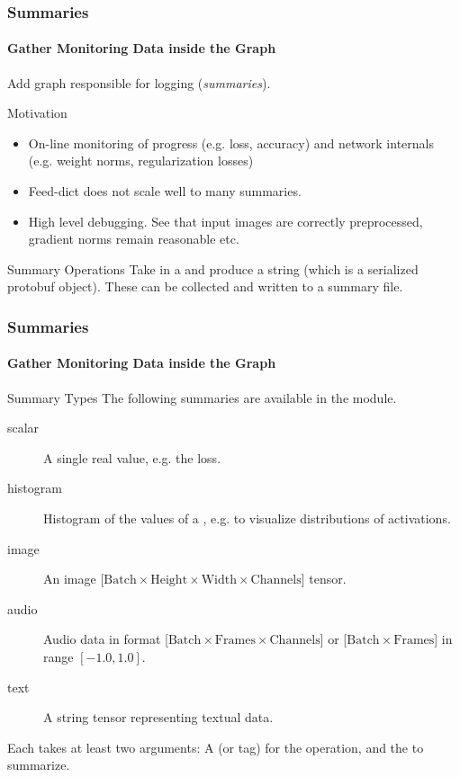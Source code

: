 
\begin{frame}
	\frametitle{Summaries}
	\framesubtitle{Gather Monitoring Data inside the Graph}
	Add graph  responsible for logging (\emph{summaries}).
	\begin{block}{Motivation}
		\begin{itemize}
			\item On-line monitoring of progress (e.g. loss, accuracy) and network internals (e.g. weight norms, regularization losses)
			\item Feed-dict does not scale well to many summaries.
			\item High level debugging. See that input images are correctly preprocessed, gradient norms remain reasonable etc. 
		\end{itemize}
	\end{block}
	\begin{block}{Summary Operations}
		Take in a  and produce a string  (which is a serialized protobuf object). These can be collected and written to a summary file. 
	\end{block}
\end{frame}

\begin{frame}
	\frametitle{Summaries}
	\framesubtitle{Gather Monitoring Data inside the Graph}
	\begin{block}{Summary Types}
	The following summaries are available in the  module.
	\begin{description}
		\item[scalar] A single real value, e.g. the loss.
		\item[histogram] Histogram of the values of a , e.g. to visualize distributions of activations.
		\item[image] An image [$\mathrm{Batch}\times\mathrm{Height}\times\mathrm{Width}\times\mathrm{Channels}$] tensor. 
		\item[audio] Audio data in format [$\mathrm{Batch}\times\mathrm{Frames}\times\mathrm{Channels}$] or [$\mathrm{Batch}\times\mathrm{Frames}$] in range $[-1.0, 1.0]$.
		\item[text] A string tensor representing textual data.
	\end{description}
	Each  takes at least two arguments: A  (or tag) for the operation, and
	the  to summarize.  
	\end{block}
\end{frame}

